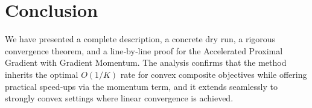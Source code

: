 \documentclass{article}
\begin{document}
\section*{Conclusion}
We have presented a complete description, a concrete dry run, a rigorous convergence theorem, and a line‑by‑line proof for the Accelerated Proximal Gradient with Gradient Momentum. The analysis confirms that the method inherits the optimal $O(1/K)$ rate for convex composite objectives while offering practical speed‑ups via the momentum term, and it extends seamlessly to strongly convex settings where linear convergence is achieved.
\end{document}
